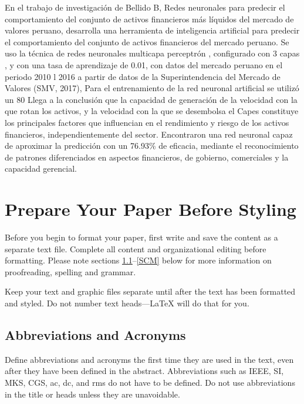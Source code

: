 \documentclass[conference]{IEEEtran}
\begin{document}
En el trabajo de investigación de Bellido B, Redes neuronales para predecir el comportamiento del conjunto de activos financieros más líquidos del mercado de valores peruano, desarrolla una herramienta de inteligencia artificial para predecir el comportamiento del conjunto de activos financieros del mercado peruano.
Se uso la técnica de redes neuronales multicapa perceptrón , configurado con 3 capas , y con una tasa de aprendizaje de 0.01, con datos del mercado peruano en el periodo 2010 l 2016 a partir de datos de la Superintendencia del Mercado de Valores (SMV, 2017), Para el entrenamiento de la red neuronal artificial se utilizó un 80%
Llega a la conclusión que la capacidad de generación de la velocidad con la que rotan los activos, y la velocidad con la que se desembolsa el Capes constituye los principales factores que influencian en el rendimiento y riesgo de los activos financieros, independientemente del sector. 
Encontraron una red neuronal capaz de aproximar la predicción con un 76.93\% de eficacia, mediante el reconocimiento de patrones diferenciados en aspectos financieros, de gobierno, comerciales y la capacidad gerencial.


\section{Prepare Your Paper Before Styling}
Before you begin to format your paper, first write and save the content as a 
separate text file. Complete all content and organizational editing before 
formatting. Please note sections \ref{AA}--\ref{SCM} below for more information on 
proofreading, spelling and grammar.

Keep your text and graphic files separate until after the text has been 
formatted and styled. Do not number text heads---{\LaTeX} will do that 
for you.

\subsection{Abbreviations and Acronyms}\label{AA}
Define abbreviations and acronyms the first time they are used in the text, 
even after they have been defined in the abstract. Abbreviations such as 
IEEE, SI, MKS, CGS, ac, dc, and rms do not have to be defined. Do not use 
abbreviations in the title or heads unless they are unavoidable.
\end{document}
